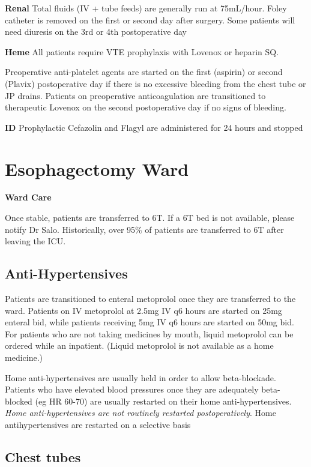 \documentclass[
]{book}
\begin{document}
\textbf{Renal}
Total fluids (IV + tube feeds) are generally run at 75mL/hour. Foley catheter is removed on the first or second day after surgery. Some patients will need diuresis on the 3rd or 4th postoperative day

\textbf{Heme}
All patients require VTE prophylaxis with Lovenox or heparin SQ.

Preoperative anti-platelet agents are started on the first (aspirin) or second (Plavix) postoperative day if there is no excessive bleeding from the chest tube or JP drains. Patients on preoperative anticoagulation are transitioned to therapeutic Lovenox on the second postoperative day if no signs of bleeding.

\textbf{ID}
Prophylactic Cefazolin and Flagyl are administered for 24 hours and stopped

\hypertarget{esophagectomy-ward}{%
\chapter{Esophagectomy Ward}\label{esophagectomy-ward}}

\textbf{Ward Care}

Once stable, patients are transferred to 6T. If a 6T bed is not available, please notify Dr Salo. Historically, over 95\% of patients are transferred to 6T after leaving the ICU.

\hypertarget{anti-hypertensives}{%
\section{Anti-Hypertensives}\label{anti-hypertensives}}

Patients are transitioned to enteral metoprolol once they are transferred to the ward. Patients on IV metoprolol at 2.5mg IV q6 hours are started on 25mg enteral bid, while patients receiving 5mg IV q6 hours are started on 50mg bid. For patients who are not taking medicines by mouth, liquid metoprolol can be ordered while an inpatient. (Liquid metoprolol is not available as a home medicine.)

Home anti-hypertensives are usually held in order to allow beta-blockade. Patients who have elevated blood pressures once they are adequately beta-blocked (eg HR 60-70) are usually restarted on their home anti-hypertensives. \emph{Home anti-hypertensives are not routinely restarted postoperatively}. Home antihypertensives are restarted on a selective basis

\hypertarget{chest-tubes}{%
\section{Chest tubes}\label{chest-tubes}}
\end{document}
